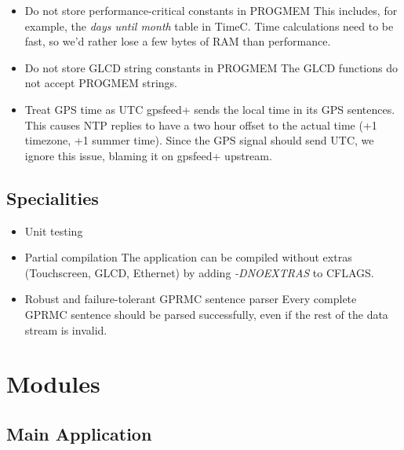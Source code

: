 \documentclass[12pt,a4paper,titlepage,oneside]{article}
\begin{document}
\begin{itemize}
\item Do not store performance-critical constants in PROGMEM
    This includes, for example, the \emph{days until month} table in TimeC.
    Time calculations need to be fast, so we'd rather lose a few bytes of RAM
    than performance.

\item Do not store GLCD string constants in PROGMEM
    The GLCD functions do not accept PROGMEM strings.

\item Treat GPS time as UTC
    gpsfeed+ sends the local time in its GPS sentences. This causes NTP replies
    to have a two hour offset to the actual time (+1 timezone, +1 summer time).
    Since the GPS signal should send UTC, we ignore this issue, blaming it on
    gpsfeed+ upstream.
 
\end{itemize}


\subsection{Specialities}

\begin{itemize}

\item Unit testing

\item Partial compilation
    The application can be compiled without extras (Touchscreen, GLCD,
    Ethernet) by adding \emph{-DNOEXTRAS} to CFLAGS.

\item Robust and failure-tolerant GPRMC sentence parser
    Every complete GPRMC sentence should be parsed successfully, even if the
    rest of the data stream is invalid.
 
\end{itemize}


\section{Modules}

\subsection{Main Application}
\end{document}
